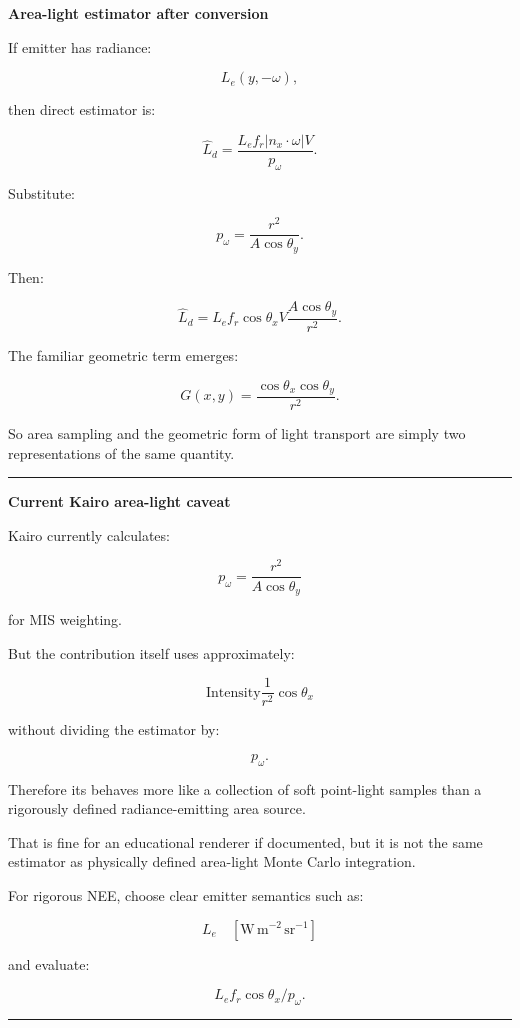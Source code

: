 \textbf{Area-light estimator after conversion}

If emitter has radiance:

\[
L_e(y,-\omega),
\]

then direct estimator is:

\[
\boxed{
\hat L_d
=
\frac{
L_e
f_r
|n_x\cdot\omega|
V
}{
p_\omega
}.
}
\]

Substitute:

\[
p_\omega
=
\frac{r^2}{A\cos\theta_y}.
\]

Then:

\[
\hat L_d
=
L_e
f_r
\cos\theta_x
V
\frac{
A\cos\theta_y
}{
r^2
}.
\]

The familiar geometric term emerges:

\[
\boxed{
G(x,y)
=
\frac{
\cos\theta_x\cos\theta_y
}{
r^2
}.
}
\]

So area sampling and the geometric form of light transport are simply two representations of the same quantity.

\begin{center}\rule{0.5\linewidth}{0.5pt}\end{center}

\textbf{Current Kairo area-light caveat}

Kairo currently calculates:

\[
p_\omega
=
\frac{r^2}{A\cos\theta_y}
\]

for MIS weighting.

But the contribution itself uses approximately:

\[
\text{Intensity}
\frac1{r^2}
\cos\theta_x
\]

without dividing the estimator by:

\[
p_\omega.
\]

Therefore its  behaves more like a collection of soft point-light samples than a rigorously defined radiance-emitting area source.

That is fine for an educational renderer if documented, but it is not the same estimator as physically defined area-light Monte Carlo integration.

For rigorous NEE, choose clear emitter semantics such as:

\[
L_e\quad[\mathrm{W\,m^{-2}\,sr^{-1}}]
\]

and evaluate:

\[
L_e f_r\cos\theta_x/p_\omega.
\]

\begin{center}\rule{0.5\linewidth}{0.5pt}\end{center}

